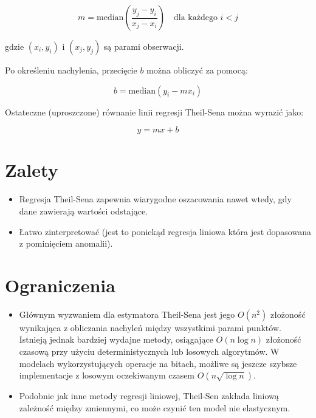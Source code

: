 $$
m = \text{median}\left(\frac{y_j - y_i}{x_j - x_i}\right) \quad \text{dla każdego } i < j
$$

gdzie $(x_i, y_i)$ i $(x_j, y_j)$ są parami obserwacji.

Po określeniu nachylenia, przecięcie $b$ można obliczyć za pomocą:

$$
b = \text{median}(y_i - m x_i)
$$

Ostateczne (uproszczone) równanie linii regresji Theil-Sena można wyrazić jako:

$$
y = mx + b
$$

{}
\section*{Zalety }
\vspace{-1.0em}
\label{sec:ml_challenges}


\begin{itemize}


\item Regresja Theil-Sena zapewnia wiarygodne oszacowania nawet wtedy, gdy dane zawierają wartości odstające.
\item Łatwo zinterpretować (jest to poniekąd regresja liniowa która jest dopasowana z pominięciem anomalii).
\end{itemize}

{}
\section*{Ograniczenia \cite{Blunck2006, cole1989optimal, Chan2010}}
\vspace{-1.0em}
\label{sec:ml_challenges}

\begin{itemize}

\item Głównym wyzwaniem dla estymatora Theil-Sena jest jego $O(n^2)$ złożoność wynikająca z obliczania nachyleń między wszystkimi parami punktów. Istnieją jednak bardziej wydajne metody, osiągające $O(n \log n)$ złożoność czasową przy użyciu deterministycznych lub losowych algorytmów. W modelach wykorzystujących operacje na bitach,  możliwe są jeszcze szybsze implementacje z losowym oczekiwanym czasem $O(n \sqrt {\log n})$.

\item Podobnie jak inne metody regresji liniowej, Theil-Sen zakłada liniową zależność między zmiennymi, co może czynić ten model nie elastycznym.
\end{itemize}

